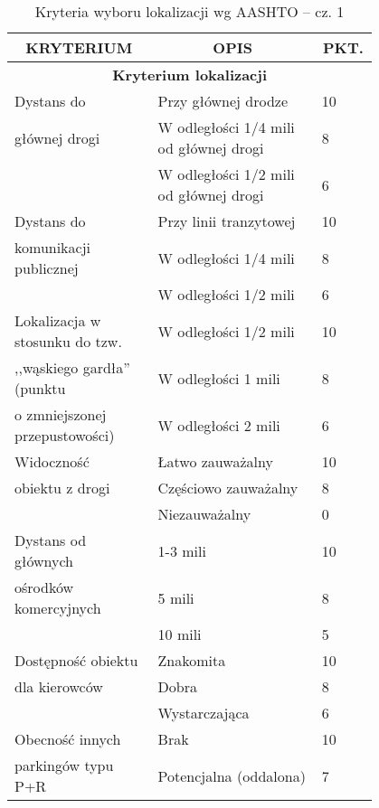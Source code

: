 \begin{table}[H]
  \centering
  \caption{Kryteria wyboru lokalizacji wg AASHTO -- cz. 1}
  \singlespacing

        \begin{tabular}{p{0.35\linewidth} p{0.4\linewidth} p{0.05\linewidth}} 
    \multicolumn{1}{c}{\textbf{KRYTERIUM}} & \multicolumn{1}{c}{\textbf{OPIS}} & \multicolumn{1}{c}{\textbf{PKT.}} \bigstrut[b]\\
    \hline
    \multicolumn{3}{c}{\textbf{Kryterium lokalizacji}} \bigstrut\\
    \hline
    Dystans do  & Przy głównej drodze & 10 \bigstrut[t]\\
    głównej drogi & W odległości 1/4 mili od głównej drogi & 8 \\
               & W odległości 1/2 mili od głównej drogi & 6 \bigstrut[b]\\
    \hline
    Dystans do  & Przy linii tranzytowej & 10 \bigstrut[t]\\
    komunikacji publicznej & W odległości 1/4 mili & 8 \\
               & W odległości 1/2 mili & 6 \bigstrut[b]\\
    \hline
    Lokalizacja w stosunku do tzw.  & W odległości 1/2 mili & 10 \bigstrut[t]\\
    ,,wąskiego gardła'' (punktu  & W odległości 1 mili & 8 \\
    o zmniejszonej przepustowości) & W odległości 2 mili & 6 \bigstrut[b]\\
    \hline
    Widoczność  & Łatwo zauważalny & 10 \bigstrut[t]\\
    obiektu z drogi & Częściowo zauważalny & 8 \\
               & Niezauważalny & 0 \bigstrut[b]\\
    \hline
    Dystans od głównych  & 1-3 mili   & 10 \bigstrut[t]\\
    ośrodków komercyjnych & 5 mili     & 8 \\
               & 10 mili    & 5 \bigstrut[b]\\
    \hline
    Dostępność obiektu  & Znakomita  & 10 \bigstrut[t]\\
    dla kierowców & Dobra      & 8 \\
               & Wystarczająca & 6 \bigstrut[b]\\
    \hline
    Obecność innych  & Brak       & 10 \bigstrut[t]\\
    parkingów typu P+R & Potencjalna (oddalona) & 7 \\

\end{tabular}
\end{table}
